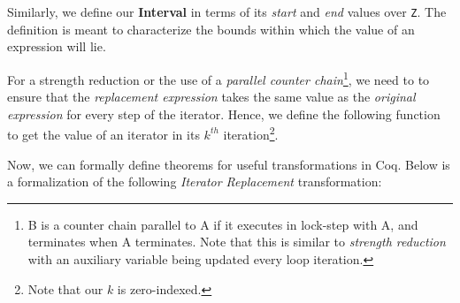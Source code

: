 Similarly, we define our \textbf{Interval} in terms of its \emph{start}
and \emph{end} values over \texttt{Z}. The definition is meant to
characterize the bounds within which the value of an expression will
lie.

\begin{Shaded}
\begin{Highlighting}[]
\OperatorTok{:=}
    \OperatorTok{|}\OperatorTok{(}\OperatorTok{:}\OperatorTok{)}

\OperatorTok{(}\OperatorTok{:}\OperatorTok{)} \OperatorTok{(}\OperatorTok{:}\OperatorTok{)} \OperatorTok{:=}
\OperatorTok{=\textgreater{}}\OperatorTok{\textless{}=}\OperatorTok{\textless{}=}
\end{Highlighting}
\end{Shaded}

For a strength reduction or the use of a \emph{parallel counter
chain}\footnote{B is a counter chain parallel to A if it executes in
  lock-step with A, and terminates when A terminates. Note that this is
  similar to \emph{strength reduction} with an auxiliary variable being
  updated every loop iteration.}, we need to to ensure that the
\emph{replacement expression} takes the same value as the \emph{original
expression} for every step of the iterator. Hence, we define the
following function to get the value of an iterator in its \(k^{th}\)
iteration\footnote{Note that our \(k\) is zero-indexed.}.

\begin{Shaded}
\begin{Highlighting}[]
\OperatorTok{(}\OperatorTok{:}\OperatorTok{)} \OperatorTok{(}\OperatorTok{:}\OperatorTok{)} \OperatorTok{:=}
  \OperatorTok{(}\OperatorTok{)} \OperatorTok{+}\OperatorTok{(}\OperatorTok{)}
\end{Highlighting}
\end{Shaded}

Now, we can formally define theorems for useful transformations in Coq.
Below is a formalization of the following \emph{Iterator Replacement}
transformation:

